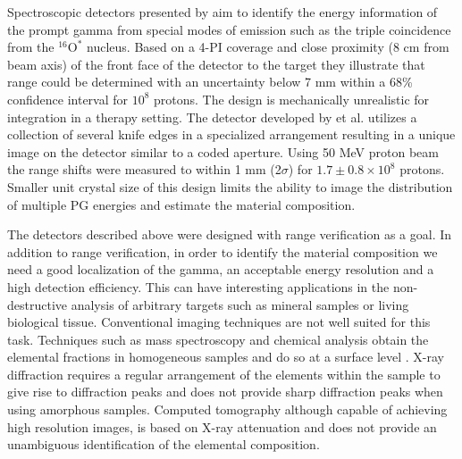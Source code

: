 \documentclass[11pt,a4paper]{article}
\begin{document}
Spectroscopic detectors presented by \cite{Panaino2019} aim to identify the energy information of the prompt gamma from special modes of emission such as the triple coincidence from the $\mathrm{^{16}O^*}$ nucleus. Based on a 4-PI coverage and close proximity (8 cm from beam axis)  of the front face of the detector to the target they illustrate that range could be determined with an uncertainty below 7 mm within a 68\% confidence interval for $\mathrm{10^{8}}$ protons. The design is mechanically unrealistic for integration in a therapy setting.
The detector developed by \cite{Ready2016} et al. utilizes a collection  of several knife edges in a specialized arrangement resulting in a unique image on the detector similar to a coded aperture. Using 50 MeV proton beam the range shifts were measured to within 1 mm (2$\sigma$) for $\mathrm{1.7\pm0.8\times 10^{8}}$ protons. Smaller unit crystal size of this design limits the ability to image the distribution of multiple PG energies and estimate the material composition.



The detectors described above were designed with range verification as a goal. In addition to range verification, in order to identify the material composition we need a good localization of the gamma, an acceptable energy resolution and a high detection efficiency.  This can have interesting applications in the non-destructive analysis of arbitrary targets such as mineral samples or living biological tissue.
Conventional imaging techniques are not well suited for this task. Techniques such  as mass spectroscopy and chemical analysis obtain the elemental fractions in homogeneous samples and do so at a surface level \cite{MassSpectroscopy}. X-ray diffraction requires a regular arrangement of the elements within the sample to give rise to diffraction peaks and does not provide sharp diffraction peaks when using amorphous samples.  Computed tomography although capable of achieving high resolution images, is based on X-ray attenuation and does not provide an unambiguous identification of the elemental composition.  
\end{document}
